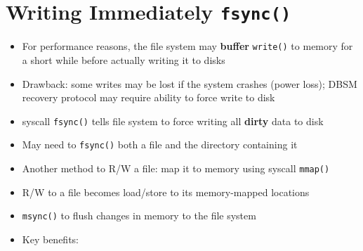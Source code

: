 \section*{Writing Immediately \texttt{fsync()}}
\begin{itemize}
\item  For performance reasons, the file system may \textbf{buffer} \texttt{write()} to memory for a short while before actually writing it to disks
\item  Drawback: some writes may be lost if the system crashes (power loss); DBSM recovery protocol may require ability to force write to disk
\item syscall \texttt{fsync()} tells file system to force writing all \textbf{dirty} data to disk
\item May need to \texttt{fsync()} both a file and the directory containing it
\end{itemize}
\begin{itemize}
\item Another method to R/W a file: map it to memory using syscall \texttt{mmap()}
\item R/W to a file becomes load/store to its memory-mapped locations
\item \texttt{msync()} to flush changes in memory to the file system
\item Key benefits:
\end{itemize}

